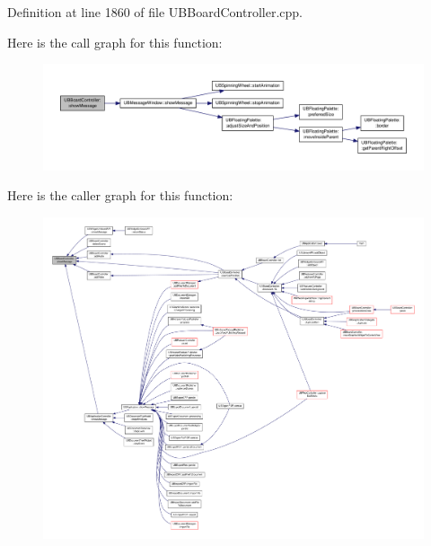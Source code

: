 Definition at line 1860 of file U\-B\-Board\-Controller.\-cpp.



Here is the call graph for this function\-:
\nopagebreak
\begin{figure}[H]
\begin{center}
\leavevmode
\includegraphics[width=350pt]{d7/d62/class_u_b_board_controller_a71ff510e4ce1e3a753f074a0e7438a00_cgraph}
\end{center}
\end{figure}




Here is the caller graph for this function\-:
\nopagebreak
\begin{figure}[H]
\begin{center}
\leavevmode
\includegraphics[width=350pt]{d7/d62/class_u_b_board_controller_a71ff510e4ce1e3a753f074a0e7438a00_icgraph}
\end{center}
\end{figure}


